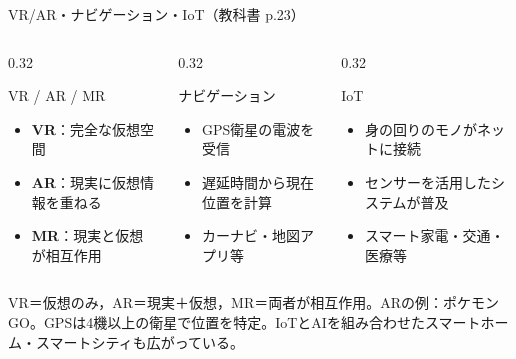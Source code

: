 \documentclass[aspectratio=43,professionalfonts,handout,10pt]{beamer}
\begin{document}

\begin{frame}{VR/AR・ナビゲーション・IoT（教科書 p.23）}
  \begin{columns}[T]
    \begin{column}{0.32\textwidth}
      \begin{block}{VR / AR / MR}
        \small
        \begin{itemize}
          \item \textbf{VR}：完全な仮想空間
          \item \textbf{AR}：現実に仮想情報を重ねる
          \item \textbf{MR}：現実と仮想が相互作用
        \end{itemize}
      \end{block}
    \end{column}
    \begin{column}{0.32\textwidth}
      \begin{exampleblock}{ナビゲーション}
        \small
        \begin{itemize}
          \item GPS衛星の電波を受信
          \item 遅延時間から現在位置を計算
          \item カーナビ・地図アプリ等
        \end{itemize}
      \end{exampleblock}
    \end{column}
    \begin{column}{0.32\textwidth}
      \begin{exampleblock}{IoT}
        \small
        \begin{itemize}
          \item 身の回りのモノがネットに接続
          \item センサーを活用したシステムが普及
          \item スマート家電・交通・医療等
        \end{itemize}
      \end{exampleblock}
    \end{column}
  \end{columns}

  \begin{slidenote}
    VR＝仮想のみ，AR＝現実＋仮想，MR＝両者が相互作用。ARの例：ポケモンGO。GPSは4機以上の衛星で位置を特定。IoTとAIを組み合わせたスマートホーム・スマートシティも広がっている。
  \end{slidenote}
\end{frame}
\end{document}
